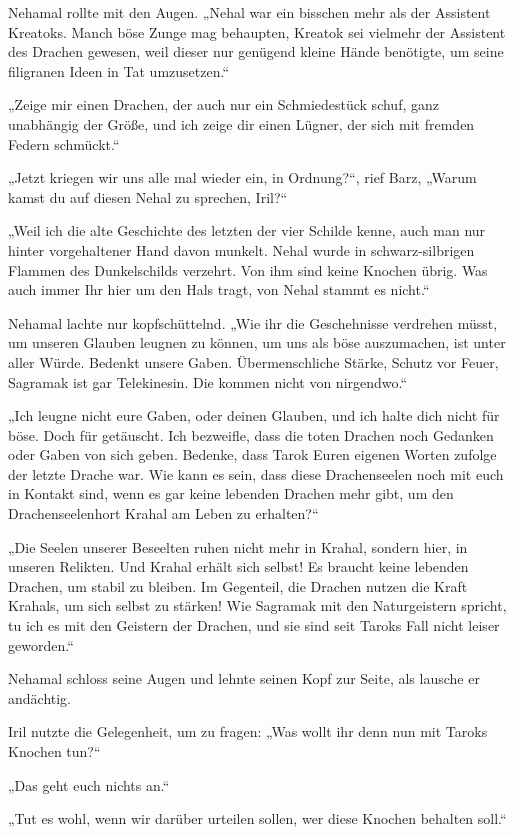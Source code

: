 Nehamal rollte mit den Augen. „Nehal war ein bisschen mehr als der Assistent Kreatoks. Manch böse Zunge mag behaupten, Kreatok sei vielmehr der Assistent des Drachen gewesen, weil dieser nur genügend kleine Hände benötigte, um seine filigranen Ideen in Tat umzusetzen.“

„Zeige mir einen Drachen, der auch nur ein Schmiedestück schuf, ganz unabhängig der Größe, und ich zeige dir einen Lügner, der sich mit fremden Federn schmückt.“

„Jetzt kriegen wir uns alle mal wieder ein, in Ordnung?“, rief Barz, „Warum kamst du auf diesen Nehal zu sprechen, Iril?“

„Weil ich die alte Geschichte des letzten der vier Schilde kenne, auch man nur hinter vorgehaltener Hand davon munkelt. Nehal wurde in schwarz-silbrigen Flammen des Dunkelschilds verzehrt. Von ihm sind keine Knochen übrig. Was auch immer Ihr hier um den Hals tragt, von Nehal stammt es nicht.“

Nehamal lachte nur kopfschüttelnd. „Wie ihr die Geschehnisse verdrehen müsst, um unseren Glauben leugnen zu können, um uns als böse auszumachen, ist unter aller Würde. Bedenkt unsere Gaben. Übermenschliche Stärke, Schutz vor Feuer, Sagramak ist gar Telekinesin. Die kommen nicht von nirgendwo.“

„Ich leugne nicht eure Gaben, oder deinen Glauben, und ich halte dich nicht für böse. Doch für getäuscht. Ich bezweifle, dass die toten Drachen noch Gedanken oder Gaben von sich geben. Bedenke, dass Tarok Euren eigenen Worten zufolge der letzte Drache war. Wie kann es sein, dass diese Drachenseelen noch mit euch in Kontakt sind, wenn es gar keine lebenden Drachen mehr gibt, um den Drachenseelenhort Krahal am Leben zu erhalten?“

„Die Seelen unserer Beseelten ruhen nicht mehr in Krahal, sondern hier, in unseren Relikten. Und Krahal erhält sich selbst! Es braucht keine lebenden Drachen, um stabil zu bleiben. Im Gegenteil, die Drachen nutzen die Kraft Krahals, um sich selbst zu stärken! Wie Sagramak mit den Naturgeistern spricht, tu ich es mit den Geistern der Drachen, und sie sind seit Taroks Fall nicht leiser geworden.“

Nehamal schloss seine Augen und lehnte seinen Kopf zur Seite, als lausche er andächtig.

Iril nutzte die Gelegenheit, um zu fragen: „Was wollt ihr denn nun mit Taroks Knochen tun?“

„Das geht euch nichts an.“

„Tut es wohl, wenn wir darüber urteilen sollen, wer diese Knochen behalten soll.“

